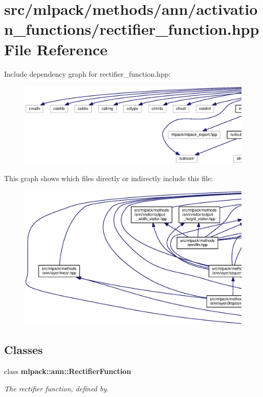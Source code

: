 \section{src/mlpack/methods/ann/activation\+\_\+functions/rectifier\+\_\+function.hpp File Reference}
\label{rectifier__function_8hpp}
Include dependency graph for rectifier\+\_\+function.\+hpp\+:
\nopagebreak
\begin{figure}[H]
\begin{center}
\leavevmode
\includegraphics[width=350pt]{rectifier__function_8hpp__incl}
\end{center}
\end{figure}
This graph shows which files directly or indirectly include this file\+:
\nopagebreak
\begin{figure}[H]
\begin{center}
\leavevmode
\includegraphics[width=350pt]{rectifier__function_8hpp__dep__incl}
\end{center}
\end{figure}
\subsection*{Classes}
\begin{DoxyCompactItemize}
\item 
class {\bf mlpack\+::ann\+::\+Rectifier\+Function}
\begin{DoxyCompactList}\small\item\em The rectifier function, defined by. \end{DoxyCompactList}\end{DoxyCompactItemize}
